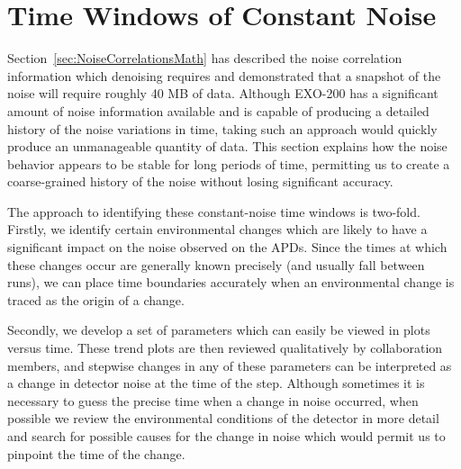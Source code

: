 \section{Time Windows of Constant Noise}\label{sec:NoiseCorrelationsTimeWindows}

Section~\ref{sec:NoiseCorrelationsMath} has described the noise correlation information which denoising requires and demonstrated that a snapshot of the noise will require roughly 40 MB of data.  Although EXO-200 has a significant amount of noise information available and is capable of producing a detailed history of the noise variations in time, taking such an approach would quickly produce an unmanageable quantity of data.  This section explains how the noise behavior appears to be stable for long periods of time, permitting us to create a coarse-grained history of the noise without losing significant accuracy.

The approach to identifying these constant-noise time windows is two-fold.  Firstly, we identify certain environmental changes which are likely to have a significant impact on the noise observed on the APDs.  Since the times at which these changes occur are generally known precisely (and usually fall between runs), we can place time boundaries accurately when an environmental change is traced as the origin of a change.

Secondly, we develop a set of parameters which can easily be viewed in plots versus time.  These trend plots are then reviewed qualitatively by collaboration members, and stepwise changes in any of these parameters can be interpreted as a change in detector noise at the time of the step.  Although sometimes it is necessary to guess the precise time when a change in noise occurred, when possible we review the environmental conditions of the detector in more detail and search for possible causes for the change in noise which would permit us to pinpoint the time of the change.

